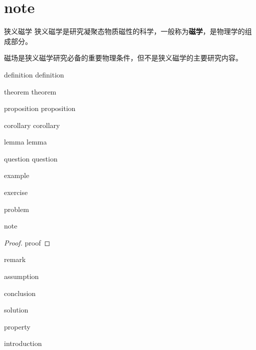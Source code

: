 \chapter{note}


\begin{definition}{狭义磁学}{}
狭义磁学是研究凝聚态物质磁性的科学，一般称为{\textbf{磁学}}，是物理学的组成部分。

磁场是狭义磁学研究必备的重要物理条件，但不是狭义磁学的主要研究内容。
\end{definition}

\begin{definition}{definition}{}
definition
\end{definition}

\begin{theorem}{theorem}{}
theorem
\end{theorem}

\begin{proposition}{proposition}{}
proposition
\end{proposition}

\begin{corollary}{corollary}{}
corollary
\end{corollary}

\begin{lemma}{lemma}{}
lemma
\end{lemma}

\begin{question}{question}{}
question
\end{question}

\begin{example}
example
\end{example}

\begin{exercise}
exercise
\end{exercise}

\begin{problem}
problem
\end{problem}

\begin{note}
note
\end{note}

\begin{proof}
proof
\end{proof}

\begin{remark}
remark
\end{remark}

\begin{assumption}
assumption
\end{assumption}

\begin{conclusion}
conclusion
\end{conclusion}

\begin{solution}
solution
\end{solution}

\begin{property}
property
\end{property}

\begin{introduction}
\item introduction
\end{introduction}
